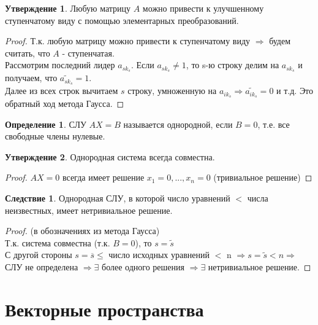 \documentclass[a4paper, 12pt]{article}
\theoremstyle{definition}
\newtheorem*{definition}{Определение}
\newtheorem*{consequense}{Следствие}
\newtheorem*{subtheorem}{Утверждение}
\begin{document}
  \begin{subtheorem}
    Любую матрицу $A$  можно привести к улучшенному ступенчатому виду с помощью элементарных преобразований.
  \end{subtheorem} 
  \begin{proof}
    Т.к. любую матрицу можно привести к ступенчатому виду $\Longrightarrow$ будем считать, что $A$ - ступенчатая. \\
    Рассмотрим последний лидер $a_{sk_s}$. Если $a_{sk_s} \neq 1$, то s-ю строку делим на $a_{sk_s}$ и получаем, что $\widetilde{a_{sk_s}}=1$. \\ Далее из всех строк вычитаем $s$ строку, умноженную на $a_{ik_s} \Longrightarrow \widetilde{a_{ik_s}}  =0$ и т.д. Это обратный ход метода Гаусса.
  \end{proof} 

  \begin{definition}
    СЛУ $AX=B$ называется однородной, если $B=0$, т.е. все свободные члены нулевые.  
  \end{definition} 
  \begin{subtheorem}
    Однородная система всегда совместна.
  \end{subtheorem} 
  \begin{proof}
    $AX=0$ всегда имеет решение $x_1=0,...,x_n=0$ (тривиальное решение)
  \end{proof} 
  \begin{consequense}
    Однородная СЛУ, в которой число уравнений $<$ числа неизвестных, имеет нетривиальное решение.  
  \end{consequense} 
  \begin{proof}
    (в обозначениях из метода Гаусса)\\
    Т.к. система совместна (т.к. $B=0$), то $s=\widetilde{s}$ \\
    С другой стороны $s=\overline{s} \leq$ число исходных уравнений $<$ n $\Longrightarrow s=\widetilde{s} < n \Longrightarrow$ СЛУ не определена $\Longrightarrow \exists$ более одного решения $\Longrightarrow \exists$ нетривиальное решение.     
  \end{proof} 

  \newpage
  \section{Векторные пространства}
\end{document}
